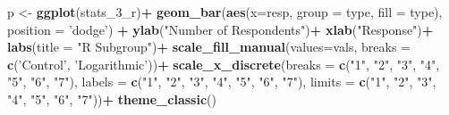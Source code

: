 \documentclass[
]{article}
\newenvironment{Shaded}{\begin{snugshade}}{\end{snugshade}}
\newcommand{\DataTypeTok}[1]{\textcolor[rgb]{0.13,0.29,0.53}{#1}}
\newcommand{\DecValTok}[1]{\textcolor[rgb]{0.00,0.00,0.81}{#1}}
\newcommand{\KeywordTok}[1]{\textcolor[rgb]{0.13,0.29,0.53}{\textbf{#1}}}
\newcommand{\NormalTok}[1]{#1}
\newcommand{\OperatorTok}[1]{\textcolor[rgb]{0.81,0.36,0.00}{\textbf{#1}}}
\newcommand{\StringTok}[1]{\textcolor[rgb]{0.31,0.60,0.02}{#1}}
\begin{document}
\begin{Shaded}
\begin{Highlighting}[]
\NormalTok{p <-}\StringTok{ }\KeywordTok{ggplot}\NormalTok{(stats_}\DecValTok{3}\NormalTok{_r)}\OperatorTok{+}
\StringTok{  }\KeywordTok{geom_bar}\NormalTok{(}\KeywordTok{aes}\NormalTok{(}\DataTypeTok{x=}\NormalTok{resp, }\DataTypeTok{group =}\NormalTok{ type, }\DataTypeTok{fill =}\NormalTok{ type), }\DataTypeTok{position =} \StringTok{'dodge'}\NormalTok{) }\OperatorTok{+}
\StringTok{  }\KeywordTok{ylab}\NormalTok{(}\StringTok{"Number of Respondents"}\NormalTok{)}\OperatorTok{+}
\StringTok{  }\KeywordTok{xlab}\NormalTok{(}\StringTok{"Response"}\NormalTok{)}\OperatorTok{+}
\StringTok{  }\KeywordTok{labs}\NormalTok{(}\DataTypeTok{title =} \StringTok{"R Subgroup"}\NormalTok{)}\OperatorTok{+}
\StringTok{  }\KeywordTok{scale_fill_manual}\NormalTok{(}\DataTypeTok{values=}\NormalTok{vals, }\DataTypeTok{breaks =} \KeywordTok{c}\NormalTok{(}\StringTok{'Control'}\NormalTok{, }\StringTok{'Logarithmic'}\NormalTok{))}\OperatorTok{+}
\StringTok{  }\KeywordTok{scale_x_discrete}\NormalTok{(}\DataTypeTok{breaks =} \KeywordTok{c}\NormalTok{(}\StringTok{"1"}\NormalTok{, }\StringTok{"2"}\NormalTok{, }\StringTok{"3"}\NormalTok{, }\StringTok{"4"}\NormalTok{, }\StringTok{"5"}\NormalTok{, }\StringTok{"6"}\NormalTok{, }\StringTok{"7"}\NormalTok{), }\DataTypeTok{labels =} \KeywordTok{c}\NormalTok{(}\StringTok{"1"}\NormalTok{, }\StringTok{"2"}\NormalTok{, }\StringTok{"3"}\NormalTok{, }\StringTok{"4"}\NormalTok{, }\StringTok{"5"}\NormalTok{, }\StringTok{"6"}\NormalTok{, }\StringTok{"7"}\NormalTok{), }\DataTypeTok{limits =} \KeywordTok{c}\NormalTok{(}\StringTok{"1"}\NormalTok{, }\StringTok{"2"}\NormalTok{, }\StringTok{"3"}\NormalTok{, }\StringTok{"4"}\NormalTok{, }\StringTok{"5"}\NormalTok{, }\StringTok{"6"}\NormalTok{, }\StringTok{"7"}\NormalTok{))}\OperatorTok{+}
\StringTok{  }\KeywordTok{theme_classic}\NormalTok{()}


\end{Highlighting}
\end{Shaded}
\end{document}
